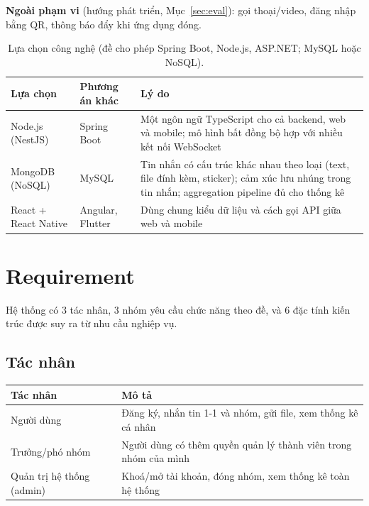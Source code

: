 \documentclass[11pt, a4paper]{article}
\begin{document}
\textbf{Ngoài phạm vi} (hướng phát triển, Mục~\ref{sec:eval}): gọi thoại/video, đăng nhập bằng QR, thông báo đẩy khi ứng dụng đóng.

\begin{table}[H]
  \centering
  \small
  \caption{Lựa chọn công nghệ (đề cho phép Spring Boot, Node.js, ASP.NET; MySQL hoặc NoSQL).}
  \label{tab:tech}
  \begin{tabularx}{\linewidth}{llY}
    \toprule
    \textbf{Lựa chọn} & \textbf{Phương án khác} & \textbf{Lý do} \\
    \midrule
    Node.js (NestJS) & Spring Boot & Một ngôn ngữ TypeScript cho cả backend, web và mobile; mô hình bất đồng bộ hợp với nhiều kết nối WebSocket \\
    MongoDB (NoSQL) & MySQL & Tin nhắn có cấu trúc khác nhau theo loại (text, file đính kèm, sticker); cảm xúc lưu nhúng trong tin nhắn; aggregation pipeline đủ cho thống kê \\
    React + React Native & Angular, Flutter & Dùng chung kiểu dữ liệu và cách gọi API giữa web và mobile \\
    \bottomrule
  \end{tabularx}
\end{table}

\section{Requirement}
\label{sec:req}

Hệ thống có 3 tác nhân, 3 nhóm yêu cầu chức năng theo đề, và 6 đặc tính kiến trúc được suy ra từ nhu cầu nghiệp vụ.

\subsection{Tác nhân}
\begin{table}[H]
  \centering
  \small
  \begin{tabularx}{\linewidth}{lY}
    \toprule
    \textbf{Tác nhân} & \textbf{Mô tả} \\
    \midrule
    Người dùng & Đăng ký, nhắn tin 1-1 và nhóm, gửi file, xem thống kê cá nhân \\
    Trưởng/phó nhóm & Người dùng có thêm quyền quản lý thành viên trong nhóm của mình \\
    Quản trị hệ thống (admin) & Khoá/mở tài khoản, đóng nhóm, xem thống kê toàn hệ thống \\
    \bottomrule
  \end{tabularx}
\end{table}
\end{document}

